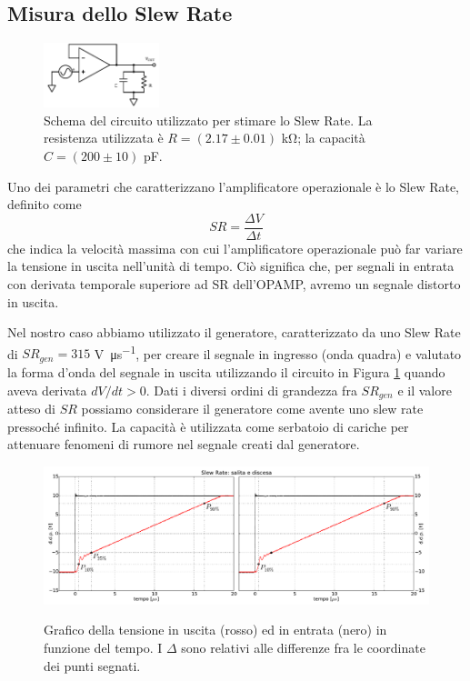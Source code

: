 \subsection{Misura dello Slew Rate}

\begin{figure}
  \begin{center}
    \includegraphics[width=0.30\textwidth]{../E03/latex/slew_rate.pdf}
  \end{center}
  \caption{Schema del circuito utilizzato per stimare lo Slew Rate. La resistenza utilizzata è $R=(2.17\pm0.01)$ \si{\kilo\ohm}; la capacità $C=(200 \pm 10)$ \si{\pico\farad}.}
  \label{cir3:slew_rate}
\end{figure}

Uno dei parametri che caratterizzano l'amplificatore operazionale è lo Slew Rate, definito come
$$SR = \frac{\Delta V}{\Delta t}$$
che indica la velocità massima con cui l'amplificatore operazionale può far variare la tensione in uscita nell'unità di tempo. Ciò significa che, per segnali in entrata con derivata temporale superiore ad SR dell'OPAMP, avremo un segnale distorto in uscita.

Nel nostro caso abbiamo utilizzato il generatore, caratterizzato da uno Slew Rate di $SR_{gen}=315$ \si{\volt\per\micro\second}, per creare il segnale in ingresso (onda quadra) e valutato la forma d'onda del segnale in uscita utilizzando il circuito in Figura \ref{cir3:slew_rate} quando aveva derivata $dV/dt > 0$. Dati i diversi ordini di grandezza fra $SR_{gen}$ e il valore atteso di $SR$ possiamo considerare il generatore come avente uno slew rate pressoché infinito. La capacità è utilizzata come serbatoio di cariche per attenuare fenomeni di rumore nel segnale creati dal generatore.

\begin{figure}[ht]
 \centering
   {\includegraphics[width=\textwidth]{../E03/latex/sr_uad.pdf}}
 \caption{Grafico della tensione in uscita (rosso) ed in entrata (nero) in funzione del tempo. I $\Delta$ sono relativi alle differenze fra le coordinate dei punti segnati.}
 \label{gr3:slew_rate}
\end{figure}


